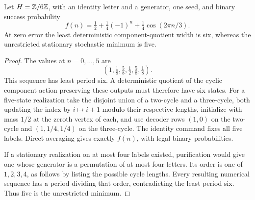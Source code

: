 \begin{proposition}\label{prop:C655}
Let $H=\mathbb Z/6\mathbb Z$, with an identity letter and a generator, one seed, and binary success probability
\[
 f(n)=\tfrac12+\tfrac14(-1)^n+\tfrac14\cos(2\pi n/3).
\]
At zero error the least deterministic component-quotient width is six, whereas the unrestricted stationary stochastic minimum is five.
\end{proposition}
\begin{proof}
The values at $n=0,\ldots,5$ are
\[
                  (1,\tfrac18,\tfrac58,\tfrac12,\tfrac58,\tfrac18).
\]
This sequence has least period six. A deterministic quotient of the cyclic component action preserving these outputs must therefore have six states. For a five-state realization take the disjoint union of a two-cycle and a three-cycle, both updating the index by $i\mapsto i+1$ modulo their respective lengths, initialize with mass $1/2$ at the zeroth vertex of each, and use decoder rows $(1,0)$ on the two-cycle and $(1,1/4,1/4)$ on the three-cycle. The identity command fixes all five labels. Direct averaging gives exactly $f(n)$, with legal binary probabilities.

If a stationary realization on at most four labels existed, purification would give one whose generator is a permutation of at most four letters. Its order is one of $1,2,3,4$, as follows by listing the possible cycle lengths. Every resulting numerical sequence has a period dividing that order, contradicting the least period six. Thus five is the unrestricted minimum.
\end{proof}
